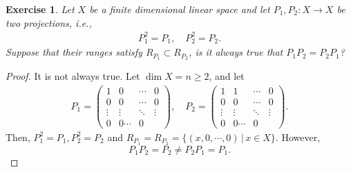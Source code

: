 \documentclass[11pt]{article}
\newtheorem{exercise}{Exercise}[section]
\theoremstyle{definition}
\numberwithin{equation}{subsection}
\begin{document}
\medskip

\begin{exercise}{\rm *}
Let $X$ be a finite dimensional linear space and let $P_1, P_2: X \to X$ be two projections, i.e.,
\begin{align*}
    P_1^2 = P_1, \quad P_2^2 = P_2.
\end{align*}
Suppose that their ranges satisfy $R_{P_1} \subset R_{P_2}$, is it always true that $P_1P_2 = P_2P_1$?
\end{exercise}
\begin{proof}
It is not always true. Let $\dim X = n \geq 2$, and let 
\begin{align*}
    P_1 = \begin{pmatrix}
        1 & 0 & \cdots & 0 \\
        0 & 0 & \cdots & 0 \\
        \vdots & \vdots & \ddots & \vdots \\
        0 & 0 \cdots & 0
    \end{pmatrix},\quad P_2 = \begin{pmatrix}
        1 & 1 & \cdots & 0 \\
        0 & 0 & \cdots & 0 \\
        \vdots & \vdots & \ddots & \vdots \\
        0 & 0 \cdots & 0 
    \end{pmatrix}.
\end{align*}
Then, $P_1^2 = P_1, P_2^2 = P_2$ and $R_{P_1} = R_{P_2} = \{(x, 0, \cdots, 0)\, | \, x \in X\}$. However, $$P_1P_2 = P_2 \neq P_2P_1 = P_1.$$
\end{proof}






\newpage


\end{document}
